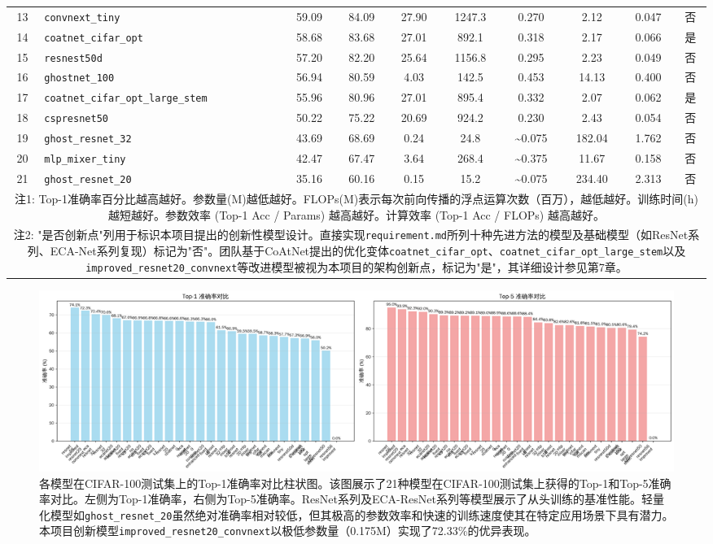 \documentclass[a4paper]{article}
\begin{document}
\begin{longtable}{clcccccccc}
13 & \texttt{convnext\_tiny} & 59.09 & 84.09 & 27.90 & 1247.3 & 0.270 & 2.12 & 0.047 & 否 \\
14 & \texttt{coatnet\_cifar\_opt} & 58.68 & 83.68 & 27.01 & 892.1 & 0.318 & 2.17 & 0.066 & 是 \\
15 & \texttt{resnest50d} & 57.20 & 82.20 & 25.64 & 1156.8 & 0.295 & 2.23 & 0.049 & 否 \\
16 & \texttt{ghostnet\_100} & 56.94 & 80.59 & 4.03 & 142.5 & 0.453 & 14.13 & 0.400 & 否 \\
17 & \texttt{coatnet\_cifar\_opt\_large\_stem} & 55.96 & 80.96 & 27.01 & 895.4 & 0.332 & 2.07 & 0.062 & 是 \\
18 & \texttt{cspresnet50} & 50.22 & 75.22 & 20.69 & 924.2 & 0.230 & 2.43 & 0.054 & 否 \\
19 & \texttt{ghost\_resnet\_32} & 43.69 & 68.69 & 0.24 & 24.8 & \textasciitilde0.075 & 182.04 & 1.762 & 否 \\
20 & \texttt{mlp\_mixer\_tiny} & 42.47 & 67.47 & 3.64 & 268.4 & \textasciitilde0.375 & 11.67 & 0.158 & 否 \\
21 & \texttt{ghost\_resnet\_20} & 35.16 & 60.16 & 0.15 & 15.2 & \textasciitilde0.075 & 234.40 & 2.313 & 否 \\
\multicolumn{10}{p{\dimexpr\linewidth-2\tabcolsep}}{\footnotesize 注1: Top-1准确率百分比越高越好。参数量(M)越低越好。FLOPs(M)表示每次前向传播的浮点运算次数（百万），越低越好。训练时间(h)越短越好。参数效率 (Top-1 Acc / Params) 越高越好。计算效率 (Top-1 Acc / FLOPs) 越高越好。} \\
\multicolumn{10}{p{\dimexpr\linewidth-2\tabcolsep}}{\footnotesize 注2: "是否创新点"列用于标识本项目提出的创新性模型设计。直接实现\texttt{requirement.md}所列十种先进方法的模型及基础模型（如ResNet系列、ECA-Net系列复现）标记为"否"。团队基于CoAtNet提出的优化变体\texttt{coatnet\_cifar\_opt}、\texttt{coatnet\_cifar\_opt\_large\_stem}以及\texttt{improved\_resnet20\_convnext}等改进模型被视为本项目的架构创新点，标记为"是"，其详细设计参见第7章。}
\end{longtable}

\begin{figure}[H]
    \centering
    \includegraphics[width=\textwidth]{fig/accuracy_comparison.png}
    \caption{各模型在CIFAR-100测试集上的Top-1准确率对比柱状图。该图展示了21种模型在CIFAR-100测试集上获得的Top-1和Top-5准确率对比。左侧为Top-1准确率，右侧为Top-5准确率。ResNet系列及ECA-ResNet系列等模型展示了从头训练的基准性能。轻量化模型如\texttt{ghost\_resnet\_20}虽然绝对准确率相对较低，但其极高的参数效率和快速的训练速度使其在特定应用场景下具有潜力。本项目创新模型\texttt{improved\_resnet20\_convnext}以极低参数量（0.175M）实现了72.33\%的优异表现。}
    \label{fig:accuracy_comparison}
\end{figure}
\end{document}
